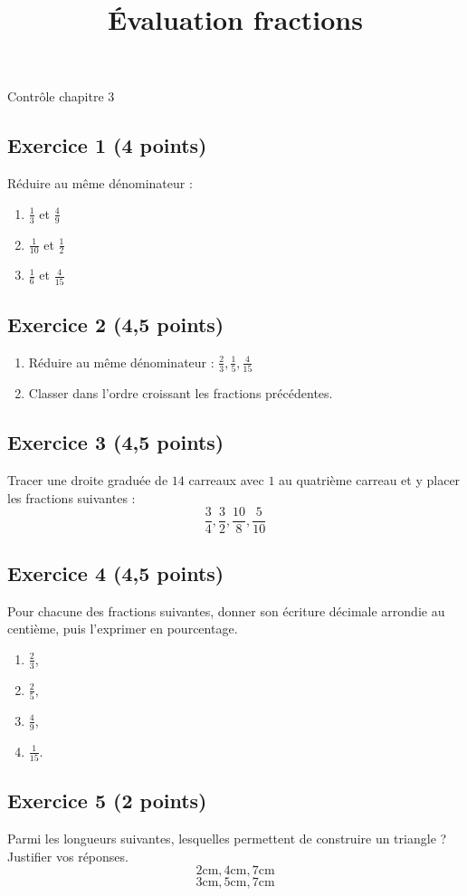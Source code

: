 \documentclass[14 pt]{extarticle}
\title{Évaluation fractions}
\date{}
\theoremstyle{plain}
\begin{document}
\begin{center}{\Large Contrôle chapitre 3}\\ 
 \end{center}
 \subsection*{Exercice 1 (4 points)}
 Réduire au même dénominateur : 
 
 \begin{enumerate}
 \item $\frac13$ et $\frac49$
 \item $\frac1{10}$ et $\frac12$
 \item $\frac16$ et $\frac4{15}$
 \end{enumerate}

\subsection*{Exercice 2 (4,5 points)}
\begin{enumerate}
\item 
Réduire au même dénominateur : 
\( \frac23, \frac15, \frac4{15}\)
\item Classer dans l'ordre croissant les fractions précédentes. 
\end{enumerate}
\subsection*{Exercice 3 (4,5 points)}

Tracer une droite graduée de $14$ carreaux avec $1$ au quatrième carreau et y placer les fractions suivantes : 
\[ \frac34, \frac32, \frac{10}8, \frac5{10}\]

\subsection*{Exercice 4 (4,5 points)}

Pour chacune des fractions suivantes, donner son écriture décimale arrondie au centième, puis l'exprimer en pourcentage.
\begin{enumerate}
\item $\frac23$,
\item $\frac25$,
\item $\frac49$,
\item $\frac{1}{15}$. 
\end{enumerate}

\subsection*{Exercice 5 (2 points)}
Parmi les longueurs suivantes, lesquelles permettent de construire un triangle ? Justifier vos réponses.
\[ 2 \text{cm}, 4 \text{cm}, 7\text{cm}\]
\[ 3 \text{cm}, 5 \text{cm}, 7\text{cm}\]


 	
\end{document}
